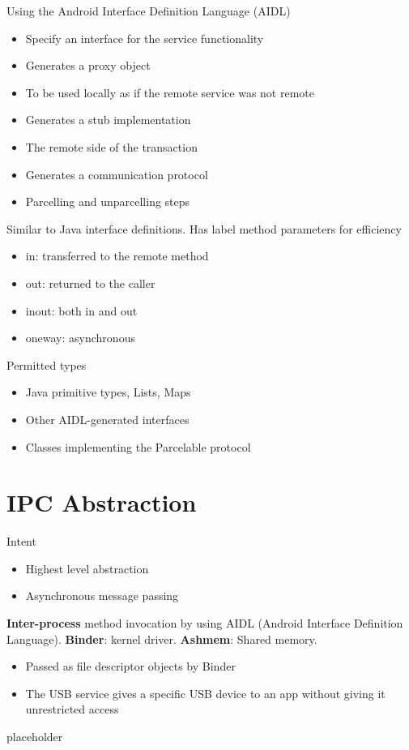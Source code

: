 \documentclass{article}
\begin{document}
\begin{flushleft}
Using the Android Interface Definition Language (AIDL)
\begin{itemize}
  \item Specify an interface for the service functionality
  \item Generates a proxy object
  \item To be used locally as if the remote service was not remote
  \item Generates a stub implementation 
  \item The remote side of the transaction
  \item Generates a communication protocol
  \item Parcelling and unparcelling steps
\end{itemize}
Similar to Java interface definitions. Has label method parameters for efficiency
\begin{itemize}
  \item in: transferred to the remote method
  \item out: returned to the caller
  \item inout: both in and out
  \item oneway: asynchronous
\end{itemize}
Permitted types
\begin{itemize}
  \item Java primitive types, Lists, Maps
  \item Other AIDL-generated interfaces
  \item Classes implementing the Parcelable protocol
\end{itemize}
\end{flushleft}

\section{IPC Abstraction}

\begin{flushleft}
Intent
\begin{itemize}
  \item Highest level abstraction
  \item Asynchronous message passing
\end{itemize}
\textbf{Inter-process} method invocation by using AIDL (Android Interface Definition Language). \textbf{Binder}: kernel driver. \textbf{Ashmem}: Shared memory.
\begin{itemize}
  \item Passed as file descriptor objects by Binder
  \item The USB service gives a specific USB device to an app without giving it unrestricted access
\end{itemize}
\end{flushleft}

\newpage

\begin{description}
	\item[placeholder] \hfill \\
\end{description}
\end{document}
